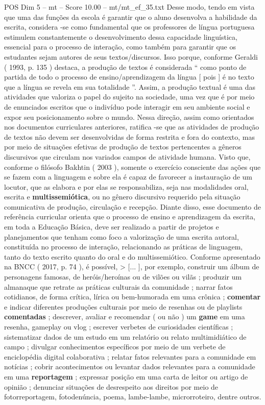 \begin{textsample}{POS Dim 5 – mt – Score 10.00 – mt/mt\_ef\_35.txt}
Desse modo, tendo em vista que uma das funções da escola é garantir que o aluno desenvolva a habilidade da escrita, considera -se como fundamental que os professores de língua portuguesa estimulem constantemente o desenvolvimento dessa capacidade linguística, essencial para o processo de interação, como também para garantir que os estudantes sejam autores de seus textos/discursos.
Isso porque, conforme Geraldi ( 1993, p. 135 ) destaca, a produção de textos é considerada “ como ponto de partida de todo o processo de ensino/aprendizagem da língua [ pois ] é no texto que a língua se revela em sua totalidade ”.
Assim, a produção textual é uma das atividades que valoriza o papel do sujeito na sociedade, uma vez que é por meio de enunciados escritos que o indivíduo pode interagir em seu ambiente social e expor seu posicionamento sobre o mundo.
Nessa direção, assim como orientados nos documentos curriculares anteriores, ratifica -se que as atividades de produção de textos não devem ser desenvolvidas de forma restrita e fora do contexto, mas por meio de situações efetivas de produção de textos pertencentes a gêneros discursivos que circulam nos variados campos de atividade humana.
Visto que, conforme o filósofo Bakhtin ( 2003 ), somente o exercício consciente das ações que se fazem com a linguagem e sobre ela é capaz de favorecer a instauração de um locutor, que as elabora e por elas se responsabiliza, seja nas modalidades oral, escrita e \textbf{multissemiótica}, ou no gênero discursivo requerido pela situação comunicativa de produção, circulação e recepção.
Diante disso, esse documento de referência curricular orienta que o processo de ensino e aprendizagem da escrita, em toda a Educação Básica, deve ser realizado a partir de projetos e planejamentos que tenham como foco a valorização de uma escrita autoral, constituída no processo de interação, relacionando as práticas de linguagem, tanto do texto escrito quanto do oral e do multissemiótico.
Conforme apresentado na BNCC ( 2017, p. 74 ), é possível, > [... ], por exemplo, construir um álbum de personagens famosas, de heróis/heroínas ou de vilões ou vilãs ; produzir um almanaque que retrate as práticas culturais da comunidade ; narrar fatos cotidianos, de forma crítica, lírica ou bem-humorada em uma crônica ; \textbf{comentar} e indicar diferentes produções culturais por meio de resenhas ou de playlists \textbf{comentadas} ; descrever, avaliar e recomendar ( ou não ) um \textbf{game} em uma resenha, gameplay ou vlog ; escrever verbetes de curiosidades científicas ; sistematizar dados de um estudo em um relatório ou relato multimidiático de campo ; divulgar conhecimentos específicos por meio de um verbete de enciclopédia digital colaborativa ; relatar fatos relevantes para a comunidade em notícias ; cobrir acontecimentos ou levantar dados relevantes para a comunidade em uma \textbf{reportagem} ; expressar posição em uma carta de leitor ou artigo de opinião ; denunciar situações de desrespeito aos direitos por meio de fotorreportagem, fotodenúncia, poema, lambe-lambe, microrroteiro, dentre outros.

\end{textsample}
